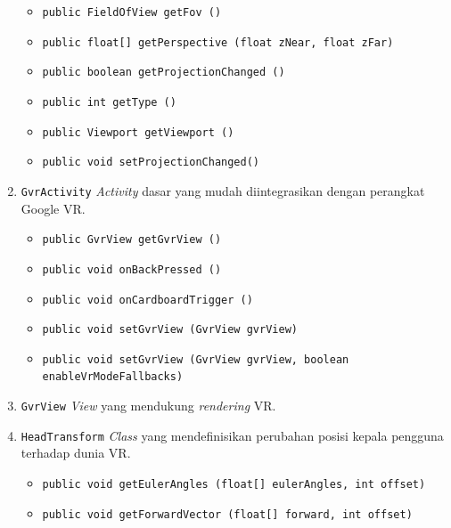 \begin{enumerate}
\begin{itemize}
				\item \texttt{public FieldOfView getFov ()}
				
				\item \texttt{public float[] getPerspective (float zNear, float zFar)}
				
				\item \texttt{public boolean getProjectionChanged ()}
				
				\item \texttt{public int getType ()}
				
				\item \texttt{public Viewport getViewport ()}
				
				\item \texttt{public void setProjectionChanged()}
			\end{itemize}
		
		\item \texttt{GvrActivity}
		\textit{Activity} dasar yang mudah diintegrasikan dengan perangkat Google VR. 
			\begin{itemize}
				\item \texttt{public GvrView getGvrView ()}
				
				\item \texttt{public void onBackPressed ()}
				
				\item \texttt{public void onCardboardTrigger ()}
				
				\item \texttt{public void setGvrView (GvrView gvrView)}
				
				\item \texttt{public void setGvrView (GvrView gvrView, boolean enableVrModeFallbacks)}
			\end{itemize}	 
		
		\item \texttt{GvrView}
		\textit{View} yang mendukung \textit{rendering} VR.
		
		\item \texttt{HeadTransform}
		\textit{Class} yang mendefinisikan perubahan posisi kepala pengguna terhadap dunia VR.
		
		\begin{itemize}
			\item \texttt{public void getEulerAngles (float[] eulerAngles, int offset)}
			
			\item \texttt{public void getForwardVector (float[] forward, int offset)}


\end{itemize}
\end{enumerate}
